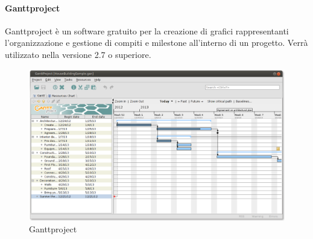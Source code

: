  \paragraph{Ganttproject} 
 Ganttproject è un software gratuito per la creazione di grafici rappresentanti l'organizzazione e gestione di compiti e milestone all'interno di un progetto. Verrà utilizzato nella versione 2.7 o superiore.
\begin{figure}[h]
\centering
\includegraphics[scale=0.35]{img/gantt.png}
\caption{Ganttproject}\label{sec:Figura6}
\end{figure} 
 